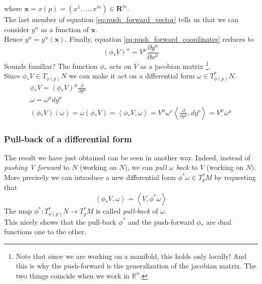 \documentclass{article}
\begin{document}
where $\textbf{x} = x(p) = (x^1, \dots, x^m) \in \mathbf{R}^m$. \\
The last member of equation \ref{eq:push_forward_vector} tells us that we can consider $y^\alpha$ as a function of $\mathbf{x}$. \\
Hence $y^\alpha = y^{\alpha}(\mathbf{x})$. Finally, equation \ref{eq:push_forward_coordinates} reduces to 
\begin{equation*}
    (\phi_* V)^\alpha = V^\mu \frac{\partial y^\alpha}{\partial x^\mu}
\end{equation*}
Sounds familiar? The function $\phi_*$ acts on $V$ as a jacobian matrix \footnote{Note that since we are working on a manifold, this holds only locally! And this is why the push-forward is the generalization of the jacobian matrix. The two things coincide when we work in $\mathbb{R}^n$.}. \\
Since $\phi_* V \in T_{\phi(p)}N$ we can make it act on a differential form $\omega \in T_{\phi(p)}^*N$.
\begin{gather*}
    \phi_* V = (\phi_*V)^\mu \frac{\partial}{\partial y^\mu} \\
    \omega = \omega^\mu dy^\mu \\
    (\phi_* V)(\omega) = \omega(\phi_*V) = \left\langle \phi_*V, \omega \right\rangle = V^\mu \omega^\nu \left\langle\frac{\partial}{\partial y^\mu}, dy^\nu \right\rangle = V^\mu \omega^\mu
\end{gather*}

\subsubsection*{Pull-back of a differential form}
The result we have just obtained can be seen in another way. Indeed, instead of \emph{pushing V forward} to $N$ (working on $N$), we can \emph{pull $\omega$ back} to $V$ (working on $N$). More precisely
we can introduce a new differential form $\phi^*\omega \in T_p^* M$ by requesting that
\begin{equation*}
    \left\langle \phi_* V, \omega \right\rangle = \left\langle V, \phi^*\omega \right\rangle
\end{equation*}
The map $\phi^* : T_{\phi(p)}^* N \to T_p^* M$ is called \emph{pull-back} of $\omega$. \\
This nicely shows that the pull-back $\phi^*$ and the push-forward $\phi_*$ are dual functions one to the other.
\end{document}

